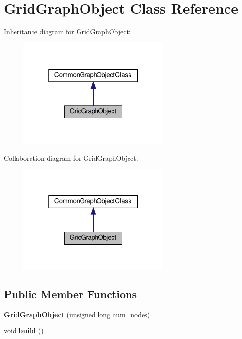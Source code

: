 \hypertarget{classGridGraphObject}{}\section{Grid\+Graph\+Object Class Reference}
\label{classGridGraphObject}


Inheritance diagram for Grid\+Graph\+Object\+:
\nopagebreak
\begin{figure}[H]
\begin{center}
\leavevmode
\includegraphics[width=217pt]{classGridGraphObject__inherit__graph}
\end{center}
\end{figure}


Collaboration diagram for Grid\+Graph\+Object\+:
\nopagebreak
\begin{figure}[H]
\begin{center}
\leavevmode
\includegraphics[width=217pt]{classGridGraphObject__coll__graph}
\end{center}
\end{figure}
\subsection*{Public Member Functions}
\begin{DoxyCompactItemize}
\item 
\mbox{\label{classGridGraphObject_a981b16c28de44a8fd235e2b0101bdf91}} 
{\bfseries Grid\+Graph\+Object} (unsigned long num\+\_\+nodes)
\item 
\mbox{\label{classGridGraphObject_ae1ae8c63313364270b36dd074e9dc243}} 
void {\bfseries build} ()
\end{DoxyCompactItemize}
